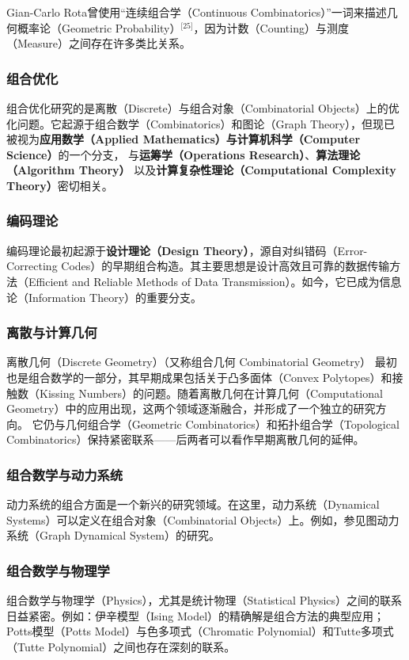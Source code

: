 Gian-Carlo Rota曾使用“连续组合学（Continuous Combinatorics）”一词来描述几何概率论（Geometric Probability）\(^\text{[25]}\)，因为计数（Counting）与测度（Measure）之间存在许多类比关系。


\subsubsection{组合优化} 
组合优化研究的是离散（Discrete）与组合对象（Combinatorial Objects）上的优化问题。它起源于组合数学（Combinatorics）和图论（Graph Theory），但现已被视为\textbf{应用数学（Applied Mathematics）与计算机科学（Computer Science）}的一个分支，  
与\textbf{运筹学（Operations Research）}、\textbf{算法理论（Algorithm Theory）}  
以及\textbf{计算复杂性理论（Computational Complexity Theory）}密切相关。
\subsubsection{编码理论}
编码理论最初起源于\textbf{设计理论（Design Theory）}，源自对纠错码（Error-Correcting Codes）的早期组合构造。其主要思想是设计高效且可靠的数据传输方法（Efficient and Reliable Methods of Data Transmission）。如今，它已成为信息论（Information Theory）的重要分支。
\subsubsection{离散与计算几何}
离散几何（Discrete Geometry）（又称组合几何 Combinatorial Geometry）  
最初也是组合数学的一部分，其早期成果包括关于凸多面体（Convex Polytopes）和接触数（Kissing Numbers）的问题。随着离散几何在计算几何（Computational Geometry）中的应用出现，这两个领域逐渐融合，并形成了一个独立的研究方向。  
它仍与几何组合学（Geometric Combinatorics）和拓扑组合学（Topological Combinatorics）保持紧密联系——后两者可以看作早期离散几何的延伸。
\subsubsection{组合数学与动力系统 }
动力系统的组合方面是一个新兴的研究领域。在这里，动力系统（Dynamical Systems）可以定义在组合对象（Combinatorial Objects）上。例如，参见图动力系统（Graph Dynamical System）的研究。
\subsubsection{组合数学与物理学}
组合数学与物理学（Physics），尤其是统计物理（Statistical Physics）之间的联系日益紧密。例如：伊辛模型（Ising Model）的精确解是组合方法的典型应用；Potts模型（Potts Model）与色多项式（Chromatic Polynomial）和Tutte多项式（Tutte Polynomial）之间也存在深刻的联系。









